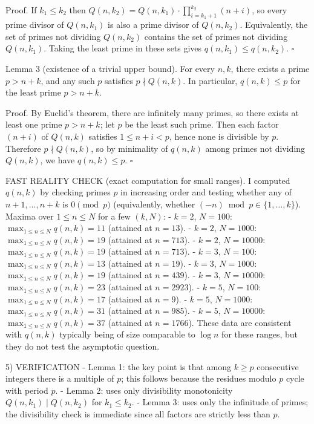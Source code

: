 Proof.
If $k_1\le k_2$ then $Q(n,k_2)=Q(n,k_1)\cdot\prod_{i=k_1+1}^{k_2}(n+i)$, so every prime divisor of $Q(n,k_1)$ is also a prime divisor of $Q(n,k_2)$.
Equivalently, the set of primes not dividing $Q(n,k_2)$ contains the set of primes not dividing $Q(n,k_1)$. Taking the least prime in these sets gives $q(n,k_1)\le q(n,k_2)$. $\square$

Lemma 3 (existence of a trivial upper bound).
For every $n,k$, there exists a prime $p>n+k$, and any such $p$ satisfies $p\nmid Q(n,k)$. In particular, $q(n,k)\le p$ for the least prime $p>n+k$.

Proof.
By Euclid's theorem, there are infinitely many primes, so there exists at least one prime $p>n+k$; let $p$ be the least such prime.
Then each factor $(n+i)$ of $Q(n,k)$ satisfies $1\le n+i < p$, hence none is divisible by $p$. Therefore $p\nmid Q(n,k)$, so by minimality of $q(n,k)$ among primes not dividing $Q(n,k)$, we have $q(n,k)\le p$. $\square$

FAST REALITY CHECK (exact computation for small ranges).
I computed $q(n,k)$ by checking primes $p$ in increasing order and testing whether any of $n+1,\ldots,n+k$ is $0\pmod p$ (equivalently, whether $(-n)\bmod p\in\{1,\ldots,k\}$).
Maxima over $1\le n\le N$ for a few $(k,N)$:
- $k=2$, $N=100$: $\max_{1\le n\le N} q(n,k) = 11$ (attained at $n=13$).
- $k=2$, $N=1000$: $\max_{1\le n\le N} q(n,k) = 19$ (attained at $n=713$).
- $k=2$, $N=10000$: $\max_{1\le n\le N} q(n,k) = 19$ (attained at $n=713$).
- $k=3$, $N=100$: $\max_{1\le n\le N} q(n,k) = 13$ (attained at $n=19$).
- $k=3$, $N=1000$: $\max_{1\le n\le N} q(n,k) = 19$ (attained at $n=439$).
- $k=3$, $N=10000$: $\max_{1\le n\le N} q(n,k) = 23$ (attained at $n=2923$).
- $k=5$, $N=100$: $\max_{1\le n\le N} q(n,k) = 17$ (attained at $n=9$).
- $k=5$, $N=1000$: $\max_{1\le n\le N} q(n,k) = 31$ (attained at $n=985$).
- $k=5$, $N=10000$: $\max_{1\le n\le N} q(n,k) = 37$ (attained at $n=1766$).
These data are consistent with $q(n,k)$ typically being of size comparable to $\log n$ for these ranges, but they do not test the asymptotic question.

5) VERIFICATION
- Lemma 1: the key point is that among $k\ge p$ consecutive integers there is a multiple of $p$; this follows because the residues modulo $p$ cycle with period $p$.
- Lemma 2: uses only divisibility monotonicity $Q(n,k_1)\mid Q(n,k_2)$ for $k_1\le k_2$.
- Lemma 3: uses only the infinitude of primes; the divisibility check is immediate since all factors are strictly less than $p$.


